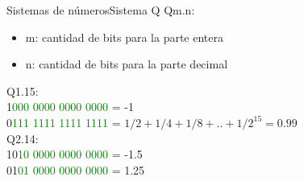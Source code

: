  \begin{frame}[t]{Sistemas de números}{Sistema Q}
       Qm.n:
       \begin{itemize}
          \item{m: cantidad de bits para la parte entera}
          \item{n: cantidad de bits para la parte decimal}
       \end{itemize}
       Q1.15: \\
          1\textcolor{green}{000 0000 0000 0000} =  -1 \\
          0\textcolor{green}{111 1111 1111 1111} = $1/2+1/4+1/8+..+1/2^{15} = 0.99$ \\
       Q2.14: \\
          10\textcolor{green}{10 0000 0000 0000} =  -1.5 \\
          01\textcolor{green}{01 0000 0000 0000} =  1.25
    \vfill
 \end{frame}
